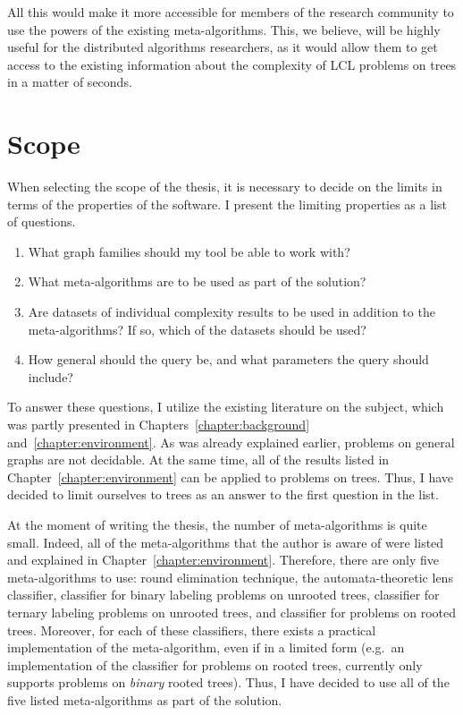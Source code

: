 All this would make it more accessible for members of the research
community to use the powers of the existing meta-algorithms.
This, we believe, will be highly useful for the distributed
algorithms researchers, as it would allow them to get access
to the existing information about the
complexity of LCL problems on trees
in a matter of seconds.

\section{Scope}

When selecting the scope of the thesis, it is necessary
to decide on the limits
in terms of the properties of the software. I present the limiting properties
as a list of questions.

\begin{enumerate}
  \item What graph families should my tool be able to work with?
  \item What meta-algorithms are to be used as part of the solution?
  \item Are datasets of individual complexity results to be used
  in addition to the meta-algorithms? If so, which of the datasets should be used?
  \item How general should the query be, and what parameters the query should include?
\end{enumerate}

To answer these questions, I utilize the existing literature on the subject, which was partly presented in Chapters~\ref{chapter:background} and~\ref{chapter:environment}. As was already explained earlier, problems on general graphs are not decidable. At the same time, all of the results listed in Chapter~\ref{chapter:environment} can be applied to problems on trees. Thus,
I have decided to limit ourselves to trees as an answer to the first question in the list.

At the moment of writing the thesis, the number of meta-algorithms is
quite small. Indeed, all of the meta-algorithms that the author
is aware of were listed and explained in
Chapter~\ref{chapter:environment}. Therefore, there are only
five meta-algorithms to use: round elimination technique,
the automata-theoretic lens classifier, classifier for
binary labeling problems on unrooted trees, classifier for
ternary labeling problems on unrooted trees, and classifier
for problems on rooted trees. Moreover, for each of these
classifiers, there exists a practical implementation of the
meta-algorithm, even if in a limited form (e.g.\ an implementation
of the classifier for problems on rooted trees, currently only
supports problems on \emph{binary} rooted trees). Thus, I have
decided to use all of the five listed meta-algorithms as part of
the solution.

